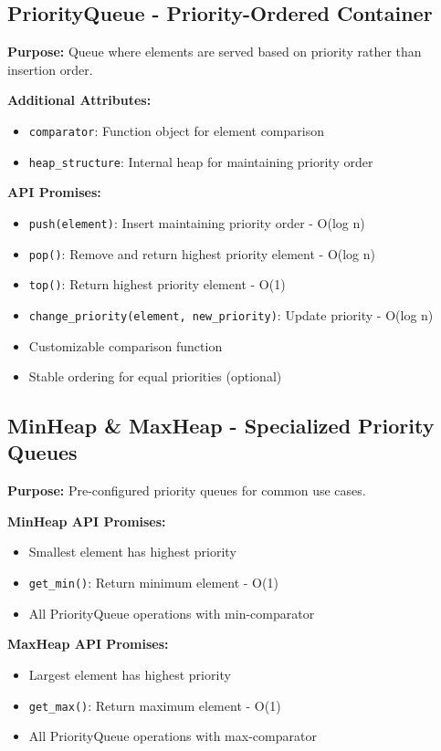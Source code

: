 \documentclass[12pt,a4paper]{article}
\begin{document}
\subsection{PriorityQueue - Priority-Ordered Container}

\textbf{Purpose:} Queue where elements are served based on priority rather than insertion order.

\textbf{Additional Attributes:}
\begin{itemize}
    \item \texttt{comparator}: Function object for element comparison
    \item \texttt{heap\_structure}: Internal heap for maintaining priority order
\end{itemize}

\textbf{API Promises:}
\begin{itemize}
    \item \texttt{push(element)}: Insert maintaining priority order - O(log n)
    \item \texttt{pop()}: Remove and return highest priority element - O(log n)
    \item \texttt{top()}: Return highest priority element - O(1)
    \item \texttt{change\_priority(element, new\_priority)}: Update priority - O(log n)
    \item Customizable comparison function
    \item Stable ordering for equal priorities (optional)
\end{itemize}

\subsection{MinHeap \& MaxHeap - Specialized Priority Queues}

\textbf{Purpose:} Pre-configured priority queues for common use cases.

\textbf{MinHeap API Promises:}
\begin{itemize}
    \item Smallest element has highest priority
    \item \texttt{get\_min()}: Return minimum element - O(1)
    \item All PriorityQueue operations with min-comparator
\end{itemize}

\textbf{MaxHeap API Promises:}
\begin{itemize}
    \item Largest element has highest priority
    \item \texttt{get\_max()}: Return maximum element - O(1)
    \item All PriorityQueue operations with max-comparator
\end{itemize}
\end{document}
